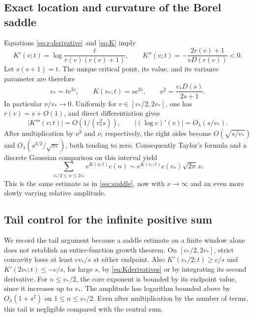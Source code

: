 \documentclass[11pt,a4paper]{article}
\theoremstyle{definition}
\numberwithin{equation}{section}
\begin{document}
\subsection{Exact location and curvature of the Borel saddle}
Equations \eqref{eq:r-derivative} and \eqref{eq:K} imply
\begin{equation}
 K'(v;t)=\log\frac{t}{r(v)(r(v)+1)},\qquad
 K''(v;t)=-\frac{2r(v)+1}{vD(r(v))}<0.
 \label{eq:Kderivatives}
\end{equation}
Let \(s(s+1)=t\). The unique critical point, its value, and its variance
parameter are therefore
\begin{equation}
 v_* =t e^{2s},\qquad
 K(v_*;t)=s e^{2s},\qquad
 \nu^2=\frac{v_*D(s)}{2s+1}.
 \label{eq:borel-saddle}
\end{equation}
In particular \(\nu/v_*\to0\). Uniformly for
\(v\in[v_*/2,2v_*]\), one has \(r(v)=s+O(1)\), and direct
differentiation gives
\begin{equation}
 |K'''(v;t)|=O(1/(v_*^2s)),\qquad
 |(\log c)'(v)|=O_\lambda(s/v_*).
 \label{eq:second-saddle-controls}
\end{equation}
After multiplication by \(\nu^3\) and \(\nu\), respectively, the
right sides become \(O(\sqrt{s/v_*})\) and
\(O_\lambda(s^{3/2}/\sqrt{v_*})\), both tending to zero.
Consequently Taylor's formula and a discrete Gaussian comparison on this
interval yield
\begin{equation}
 \sum_{v_*/2\le n\le2v_*} e^{K(n;t)}c(n)
           \sim e^{K(v_*;t)}c(v_*)\sqrt{2\pi}\,\nu.
 \label{eq:borel-central-sum}
\end{equation}
This is the same estimate as in \cref{sec:saddle}, now with
\(\nu\to\infty\) and an even more slowly varying relative amplitude.

\subsection{Tail control for the infinite positive sum}
We record the tail argument because a saddle estimate on a finite window
alone does not establish an entire-function growth theorem.
On \([v_*/2,2v_*]\), strict concavity loses at least
\(c v_*/s\) at either endpoint. Also
\(K'(v_*/2;t)\ge c/s\) and \(K'(2v_*;t)\le-c/s\), for large \(s\),
by \eqref{eq:Kderivatives} or by integrating its second derivative.
For \(n\le v_*/2\), the core exponent is bounded by its endpoint value,
since it increases up to \(v_*\). The amplitude has logarithm bounded
above by \(O_\lambda(1+s^2)\) on \(1\le n\le v_*/2\).
Even after multiplication by the number of terms, this tail is negligible
compared with the central sum.
\end{document}
